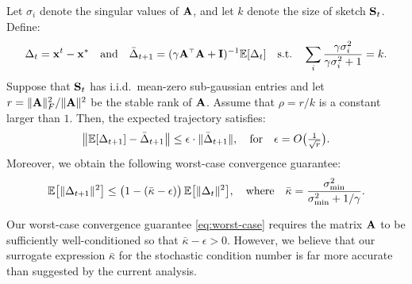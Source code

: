 \documentclass{article}
\begin{document}
\begin{corollary}\label{c:kaczmarz2}
Let $\sigma_i$ denote the singular values of $\A$, and let $k$ denote
the size of sketch $\S_t$. Define:
\begin{align*}
\Delta_t=\x^t-\x^*\quad\text{and}\quad  \bar\Delta_{t+1} =
  (\gamma\A^\top\A+\I)^{-1}\E[\Delta_t]\quad\text{s.t.}\quad
  \sum_i\frac{\gamma\sigma_i^2}{\gamma\sigma_i^2+1}=k.
\end{align*}
  Suppose that $\S_t$ has i.i.d.~mean-zero sub-gaussian entries and let
  $r=\|\A\|_F^2/\|\A\|^2$ be the stable rank of $\A$. 
Assume that $\rho = r/k$ is a constant larger than $1$. Then, the
expected trajectory satisfies:
\begin{align}
  \big\|\E[\Delta_{t+1}] - \bar\Delta_{t+1}\big\|
  \leq \epsilon\cdot \|\bar\Delta_{t+1}\|,
  \quad\text{for}\quad\epsilon=O\big(\tfrac1{\sqrt
  r}\big).\label{eq:trajectory}
\end{align}
Moreover, we obtain the following worst-case convergence guarantee:
\begin{align}
  \E\big[\|\Delta_{t+1}\|^2\big]
  \leq \big(1-
  (\bar\kappa-\epsilon)\big)\,\E\big[\|\Delta_t\|^2\big],
  \quad\text{where}\quad
  \bar\kappa = \frac{\sigma_{\min}^2}{\sigma_{\min}^2+1/\gamma}.\label{eq:worst-case}
\end{align}
\end{corollary}
\begin{remark}
Our worst-case convergence guarantee \eqref{eq:worst-case}
  requires the matrix $\A$ to be sufficiently well-conditioned so
  that $\bar\kappa-\epsilon>0$. However, we believe that our surrogate expression
  $\bar\kappa$ for the stochastic condition number is far more
  accurate than suggested by the current analysis. 
\end{remark}
\end{document}
